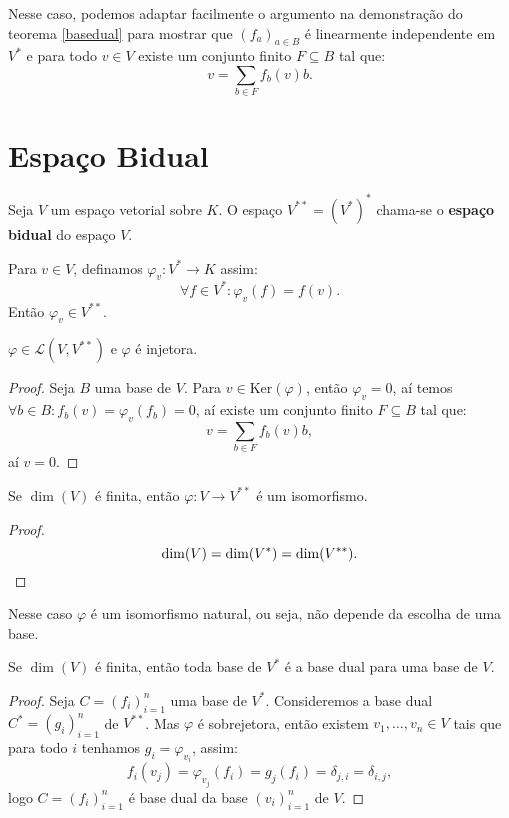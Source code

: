 \documentclass[11pt,twoside,a4paper]{book}
\begin{document}
\noindent
Nesse caso, podemos adaptar facilmente o argumento na demonstração do teorema \ref{basedual} para mostrar que $(f_a)_{a\in B}$ é linearmente independente em $V^*$ e para todo $v\in V$ existe um conjunto finito $F\subseteq B$ tal que:
\[
v=\sum_{b\in F}f_b(v)b.
\]

\section{Espaço Bidual}

\begin{definicao}
Seja $V$ um espaço vetorial sobre $K$. O espaço $V^{**}=(V^*)^*$ chama-se o \textbf{espaço bidual} do espaço $V$.
\end{definicao}

\begin{definicao}
Para $v\in V$, definamos $\varphi_v:V^*\rightarrow K$ assim:
\[
\forall f\in V^*:\varphi_v(f)=f(v).
\]
Então $\varphi_v\in V^{**}$.
\end{definicao}

\begin{proposicao}
$\varphi\in\mathcal{L}(V,V^{**})$ e $\varphi$ é injetora.
\end{proposicao}
\begin{proof}
Seja $B$ uma base de $V$. Para $v\in\mathrm{Ker}(\varphi)$, então $\varphi_v=0$, aí temos $\forall b\in B:f_b(v)=\varphi_v(f_b)=0$, aí existe um conjunto finito $F\subseteq B$ tal que:
\[
v=\sum_{b\in F}f_b(v)b,
\]
aí $v=0$.
\end{proof}

\begin{corolario}
Se $\dim(V)$ é finita, então $\varphi:V\rightarrow V^{**}$ é um isomorfismo.
\end{corolario}
\begin{proof}
\[
\dim(V)=\dim(V^*)=\dim(V^{**}). \qedhere
\]
\end{proof}

\begin{observacao}
Nesse caso $\varphi$ é um isomorfismo natural, ou seja, não depende da escolha de uma base.
\end{observacao}

\begin{corolario}
Se $\dim(V)$ é finita, então toda base de $V^*$ é a base dual para uma base de $V$.
\end{corolario}
\begin{proof}
Seja $C=(f_i)_{i=1}^n$ uma base de $V^*$. Consideremos a base dual $C^*=(g_i)_{i=1}^n$ de $V^{**}$. Mas $\varphi$ é sobrejetora, então existem $v_1,\dots,v_n\in V$ tais que para todo $i$ tenhamos $g_i=\varphi_{v_i}$, assim:
\[
f_i(v_j)=\varphi_{v_j}(f_i)=g_j(f_i)=\delta_{j,i}=\delta_{i,j},
\]
logo $C=(f_i)_{i=1}^n$ é base dual da base $(v_i)_{i=1}^n$ de $V$.
\end{proof}
\end{document}
